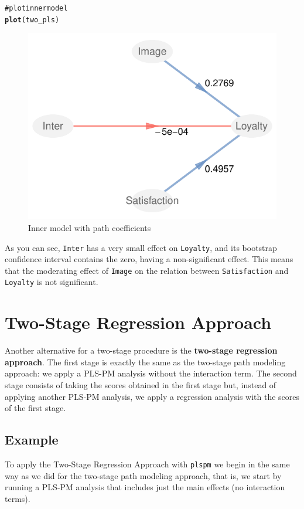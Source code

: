 \documentclass[12pt]{book}\usepackage{graphicx, color}
\makeatletter
\newcommand{\hlfunctioncall}[1]{\textcolor[rgb]{0.501960784313725,0,0.329411764705882}{\textbf{#1}}}%
\newcommand{\hlcomment}[1]{\textcolor[rgb]{0.180392156862745,0.6,0.341176470588235}{#1}}%
\newenvironment{kframe}{%
 \def\at@end@of@kframe{}%
 \ifinner\ifhmode%
  \def\at@end@of@kframe{\end{minipage}}%
  \begin{minipage}{\columnwidth}%
 \fi\fi%
 \def\FrameCommand##1{\hskip\@totalleftmargin \hskip-\fboxsep
 \colorbox{shadecolor}{##1}\hskip-\fboxsep
     \hskip-\linewidth \hskip-\@totalleftmargin \hskip\columnwidth}%
 \MakeFramed {\advance\hsize-\width
   \@totalleftmargin\z@ \linewidth\hsize
   \@setminipage}}%
 {\par\unskip\endMakeFramed%
 \at@end@of@kframe}
\newenvironment{knitrout}{}{} %
\newcommand{\plspm}{\texttt{plspm}}
\makeatother
\begin{document}
\begin{knitrout}
\color{fgcolor}\begin{kframe}
\begin{alltt}
\hlcomment{# plot inner model}
\hlfunctioncall{plot}(two_pls)
\end{alltt}
\end{kframe}\begin{figure}[h]


{\centering \includegraphics[width=.6\linewidth,height=.4\linewidth]{figure/TwoStageApp_plot_inner} 

}

\caption[Inner model with path coefficients]{Inner model with path coefficients\label{fig:TwoStageApp_plot_inner}}
\end{figure}


\end{knitrout}


As you can see, \texttt{Inter} has a very small effect on \texttt{Loyalty}, and its bootstrap confidence interval contains the zero, having a non-significant effect. This means that the moderating effect of \texttt{Image} on the relation between \texttt{Satisfaction} and \texttt{Loyalty} is not significant.




\section{Two-Stage Regression Approach}
Another alternative for a two-stage procedure is the \textbf{two-stage regression approach}. The first stage is exactly the same as the two-stage path modeling approach: we apply a PLS-PM analysis without the interaction term. The second stage consists of taking the scores obtained in the first stage but, instead of applying another PLS-PM analysis, we apply a regression analysis with the scores of the first stage.

\subsection{Example}
To apply the Two-Stage Regression Approach with \plspm{} we begin in the same way as we did for the two-stage path modeling approach, that is, we start by running a PLS-PM analysis that includes just the main effects (no interaction terms).
\end{document}
